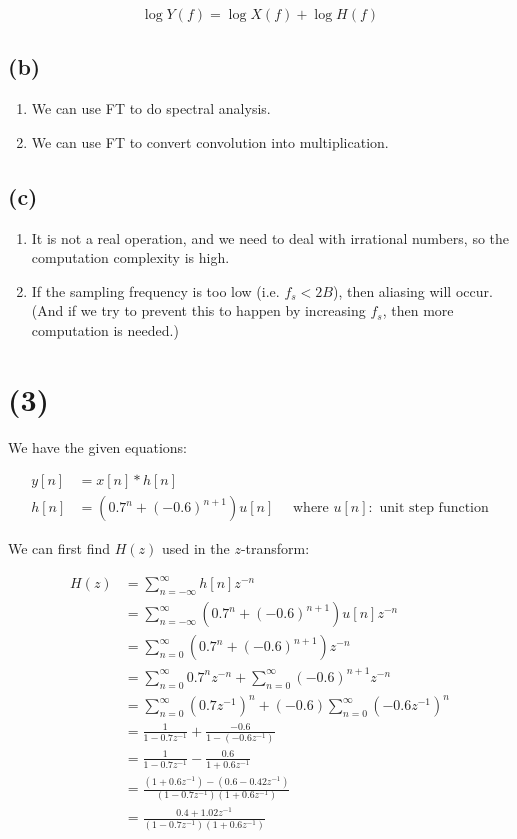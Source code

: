 \documentclass{article}
\begin{document}
\begin{equation*}
    \log Y(f) = \log X(f) + \log H(f)
\end{equation*}

\subsection*{(b)}

\begin{enumerate}
    \item We can use FT to do spectral analysis.
    \item We can use FT to convert convolution into multiplication.
\end{enumerate}

\subsection*{(c)}

\begin{enumerate}
    \item It is not a real operation, and we need to deal with irrational numbers, so the computation complexity is high.
    \item If the sampling frequency is too low (i.e. $f_s < 2B$), then aliasing will occur. (And if we try to prevent this to happen by increasing $f_s$, then more computation is needed.)
\end{enumerate}

\section*{(3)}

We have the given equations:

\begin{align*}
    y[n] &= x[n] * h[n] \\
    h[n] &= (0.7^n + (-0.6)^{n+1})u[n]  \quad \text{ where } u[n]: \text{ unit step function}
\end{align*}

We can first find $H(z)$ used in the $z$-transform:

\begin{align*}
    H(z) &= \sum_{n=-\infty}^{\infty} h[n]z^{-n} \\
    &= \sum_{n=-\infty}^{\infty} (0.7^n + (-0.6)^{n+1})u[n]z^{-n} \\
    &= \sum_{n=0}^{\infty} (0.7^n + (-0.6)^{n+1})z^{-n} \\
    &= \sum_{n=0}^{\infty} 0.7^nz^{-n} + \sum_{n=0}^{\infty} (-0.6)^{n+1}z^{-n} \\
    &= \sum_{n=0}^{\infty} (0.7 z^{-1})^n + (-0.6)\sum_{n=0}^{\infty} (-0.6 z^{-1})^n \\
    &= \frac{1}{1-0.7z^{-1}} + \frac{-0.6}{1-(-0.6z^{-1})} \\
    &= \frac{1}{1-0.7z^{-1}} - \frac{0.6}{1+0.6z^{-1}} \\
    &= \frac{(1+0.6z^{-1}) - (0.6 - 0.42z^{-1})}{(1-0.7z^{-1})(1+0.6z^{-1})} \\
    &= \frac{0.4 + 1.02z^{-1}}{(1-0.7z^{-1})(1+0.6z^{-1})} \\
\end{align*}
\end{document}
